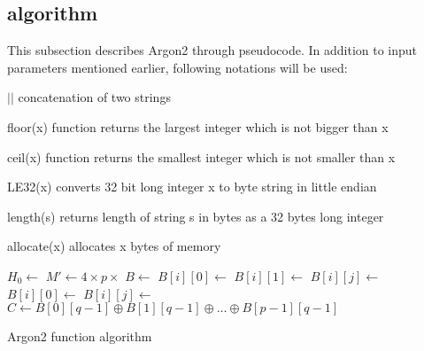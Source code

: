 \documentclass[nolof]{fithesis3}
\begin{document}
\subsection{algorithm}
This subsection describes Argon2 through pseudocode. In addition to input parameters mentioned earlier, following notations will be used:

\begin{description}
\item{\(||\)} concatenation of two strings

\item{floor(x)} function returns the largest integer which is not bigger than x

\item{ceil(x)} function returns the smallest integer which is not smaller than x

\item{LE32(x)} converts 32 bit long integer x to byte string in little endian

\item{length(s)} returns length of string s in bytes as a 32 bytes long integer

\item{allocate(x)} allocates x bytes of memory
\end{description}

\begin{algorithm}
\DontPrintSemicolon
\LinesNumbered
{}
\(H_0 \leftarrow \)  \;
\(M' \leftarrow 4 \times p \times \)  \;
\(B \leftarrow \)  \;
 {
\(B[i][0] \leftarrow \)  \;
}
 {
\(B[i][1] \leftarrow \)  \;
}
 {
 {
\(B[i][j] \leftarrow \)  \;
}
}
 {
 {
\(B[i][0] \leftarrow \)  \;
 {
\(B[i][j] \leftarrow \)  \;
}
}
}
\(C \leftarrow B[0][q-1] \oplus B[1][q-1] \oplus \dots \oplus B[p-1][q-1]\) \;
\caption{Argon2 function algorithm}
\label{argon2alg}
\end{algorithm}
\end{document}
